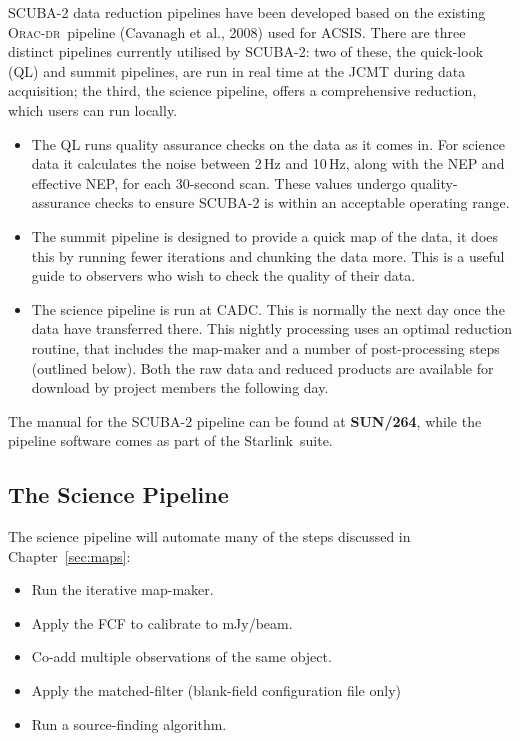 \documentclass[twoside,11pt]{article}
\newcommand{\htmladdnormallink}[2]{#1}
\newcommand{\htmlref}[2]{#1}
\newcommand{\latexhtml}[2]{#1}
\newcommand{\xref}[3]{#1}
\newcommand{\xlabel}[1]{}
\renewcommand{\_}{\texttt{\symbol{95}}}
\newcommand{\starlink}{\htmladdnormallink{Starlink}{http://starlink.jach.hawaii.edu}}
\newcommand{\oracdr}{\htmladdnormallink{\textsc{Orac-dr}}{http://www.oracdr.org/oracdr}}
\newcommand{\pipelinesun}{\xref{\textbf{SUN/264}}{sun264}{}}
\newcommand{\cref}[3]{\latexhtml{#1~\ref{#2}}{\htmlref{#3}{#2}}}
\begin{document}
SCUBA-2 data reduction pipelines have been developed based on the
existing \oracdr\ pipeline (Cavanagh et al., 2008\cite{oracdr}) used
for ACSIS. There are three distinct pipelines currently utilised by
SCUBA-2: two of these, the quick-look (QL) and summit pipelines, are
run in real time at the JCMT during data acquisition; the third, the science
pipeline, offers a comprehensive reduction, which users can run locally.

\begin{itemize}
\item The QL runs quality assurance checks on the data as it comes in.
For science data it calculates the noise between 2\,Hz and 10\,Hz,
along with the NEP and effective NEP, for each 30-second scan. These
values undergo quality-assurance checks to ensure SCUBA-2 is within
an acceptable operating range.
\item The summit pipeline is designed to provide a quick map of the
data, it does this by running fewer iterations and chunking the data
more. This is a useful guide to observers who wish to check the
quality of their data.
\item The science pipeline is run at CADC. This is normally the next
day once the data have transferred there.  This nightly processing
uses an optimal reduction routine, that includes the map-maker and a
number of post-processing steps (outlined below). Both the raw data
and reduced products are available for download by project members the
following day.
\end{itemize}

The manual for the SCUBA-2 pipeline can be found at \pipelinesun,
while the pipeline software comes as part of the \starlink\ suite.


\subsection{\xlabel{science_pl}The Science Pipeline}

The science pipeline will automate many of the steps discussed in
\cref{Chapter}{sec:maps}{Reducing Your Data}:
\vspace{-0.3cm}
\begin{itemize}\itemsep-0.3em
\item Run the iterative map-maker.
\item Apply the FCF to calibrate to mJy/beam.
\item Co-add multiple observations of the same object.
\item Apply the matched-filter (blank-field configuration file only)
\item Run a source-finding algorithm.
\end{itemize}
\end{document}
